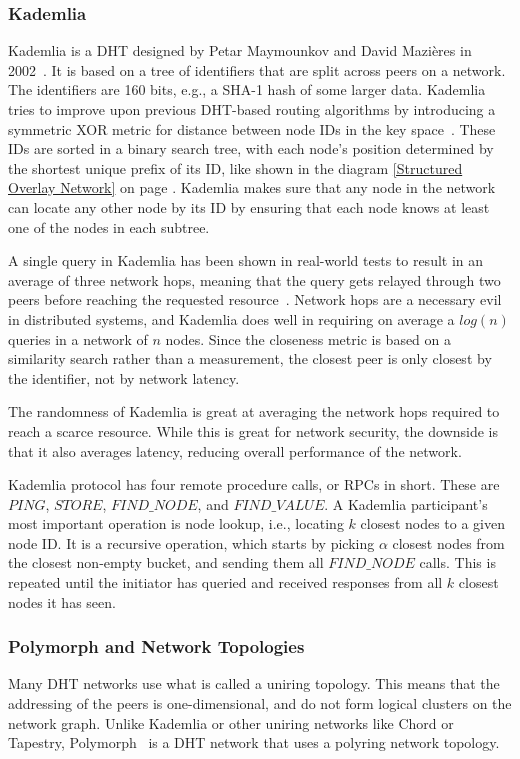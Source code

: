 \subsubsection{Kademlia}
Kademlia is a DHT designed by Petar Maymounkov and David Mazières in 2002~\cite{Petar_Maymounkov2020}. It is based on a tree of identifiers that are split across peers on a network. The identifiers are 160 bits, e.g., a SHA-1 hash of some larger data. Kademlia tries to improve upon previous DHT-based routing algorithms by introducing a symmetric XOR metric for distance between node IDs in the key space~\cite{Petar_Maymounkov2020-sx}. These IDs are sorted in a binary search tree, with each node's position determined by the shortest unique prefix of its ID, like shown in the diagram \ref{Structured Overlay Network} on page \pageref{Structured Overlay Network}. Kademlia makes sure that any node in the network can locate any other node by its ID by ensuring that each node knows at least one of the nodes in each subtree.

A single query in Kademlia has been shown in real-world tests to result in an average of three network hops, meaning that the query gets relayed through two peers before reaching the requested resource~\cite{Roos2013-mb}. Network hops are a necessary evil in distributed systems, and Kademlia does well in requiring on average a \(log(n)\) queries in a network of \(n\) nodes. Since the closeness metric is based on a similarity search rather than a measurement, the closest peer is only closest by the identifier, not by network latency.~\cite{Eigenmann2020-zm}

The randomness of Kademlia is great at averaging the network hops required to reach a scarce resource. While this is great for network security, the downside is that it also averages latency, reducing overall performance of the network.

Kademlia protocol has four remote procedure calls, or RPCs in short. These are \(\mathit{PING}\), \(\mathit{STORE}\), \(\mathit{FIND\_NODE}\), and \(\mathit{FIND\_VALUE}\). A Kademlia participant's most important operation is node lookup, i.e., locating \(k\) closest nodes to a given node ID. It is a recursive operation, which starts by picking \(\alpha\) closest nodes from the closest non-empty bucket, and sending them all \(\mathit{FIND\_NODE}\) calls. This is repeated until the initiator has queried and received responses from all \(k\) closest nodes it has seen.

\subsubsection{Polymorph and Network Topologies}
Many DHT networks use what is called a uniring topology. This means that the addressing of the peers is one-dimensional, and do not form logical clusters on the network graph. Unlike Kademlia or other uniring networks like Chord or Tapestry, Polymorph~\cite{Jenkov_undated-kl} is a DHT network that uses a polyring network topology.

